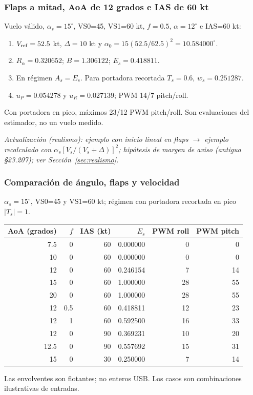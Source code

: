 \documentclass[11pt,a4paper]{article}
\begin{document}
\subsubsection{Flaps a mitad, AoA de 12 grados e IAS de 60 kt}
Vuelo válido, $\alpha_s=15^\circ$, VS0=45, VS1=60 kt, $f=0.5$, $\alpha=12^\circ$ e IAS=60 kt:
\begin{enumerate}
\item $V_{\rm ref}=52.5$ kt, $\Delta=10$ kt y $\alpha_0=15(52.5/62.5)^2=10.584000^\circ$.
\item $R_\alpha=0.320652$; $B=1.306122$; $E_s=0.418811$.
\item En régimen $A_s=E_s$. Para portadora recortada $T_s=0.6$, $w_s=0.251287$.
\item $u_P=0.054278$ y $u_R=0.027139$; PWM 14/7 pitch/roll.
\end{enumerate}
Con portadora en pico, máximos 23/12 PWM pitch/roll. Son evaluaciones del estimador, no un vuelo medido.

\textit{Actualización (realismo): ejemplo con inicio lineal en flaps $\rightarrow$ ejemplo recalculado con $\alpha_s[V_s/(V_s+\Delta)]^2$; hipótesis de margen de aviso (antigua §23.207); ver Sección~\ref{sec:realismo}.}

\subsubsection{Comparación de ángulo, flaps y velocidad}
$\alpha_s=15^\circ$, VS0=45 y VS1=60 kt; régimen con portadora recortada en pico $|T_s|=1$.
\begin{center}\begin{tabular}{rrrrrr}
\toprule AoA (grados)&$f$&IAS (kt)&$E_s$&PWM roll&PWM pitch\\\midrule
7.5&0&60&0.000000&0&0\\
10&0&60&0.000000&0&0\\
12&0&60&0.246154&7&14\\
15&0&60&1.000000&28&55\\
20&0&60&1.000000&28&55\\
12&0.5&60&0.418811&12&23\\
12&1&60&0.592500&16&33\\
12&0&90&0.369231&10&20\\
12.5&0&90&0.557692&15&31\\
15&0&30&0.250000&7&14\\
\bottomrule\end{tabular}\end{center}
Las envolventes son flotantes; no enteros USB. Los casos son combinaciones ilustrativas de entradas.
\end{document}
